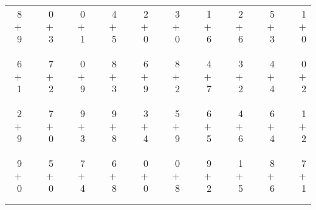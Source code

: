 \documentclass[12pt, letterpaper]{article}
\begin{document}
\begin{tabular}{rrrrrrrrrrrrrrrrrrr}
8 & & 0 & & 0 & & 4 & & 2 & & 3 & & 1 & & 2 & & 5 & & 1\\
$+$ 9 & & $+$ 3 & & $+$ 1 & & $+$ 5 & & $+$ 0 & & $+$ 0 & & $+$ 6 & & $+$ 6 & & $+$ 3 & & $+$ 0\\
\cline{1-1} \cline{3-3} \cline{5-5} \cline{7-7} \cline{9-9} \cline{11-11} \cline{13-13} \cline{15-15} \cline{17-17} \cline{19-19} \\ \\
6 & & 7 & & 0 & & 8 & & 6 & & 8 & & 4 & & 3 & & 4 & & 0\\
$+$ 1 & & $+$ 2 & & $+$ 9 & & $+$ 3 & & $+$ 9 & & $+$ 2 & & $+$ 7 & & $+$ 2 & & $+$ 4 & & $+$ 2\\
\cline{1-1} \cline{3-3} \cline{5-5} \cline{7-7} \cline{9-9} \cline{11-11} \cline{13-13} \cline{15-15} \cline{17-17} \cline{19-19} \\ \\
2 & & 7 & & 9 & & 9 & & 3 & & 5 & & 6 & & 4 & & 6 & & 1\\
$+$ 9 & & $+$ 0 & & $+$ 3 & & $+$ 8 & & $+$ 4 & & $+$ 9 & & $+$ 5 & & $+$ 6 & & $+$ 4 & & $+$ 2\\
\cline{1-1} \cline{3-3} \cline{5-5} \cline{7-7} \cline{9-9} \cline{11-11} \cline{13-13} \cline{15-15} \cline{17-17} \cline{19-19} \\ \\
9 & & 5 & & 7 & & 6 & & 0 & & 0 & & 9 & & 1 & & 8 & & 7\\
$+$ 0 & & $+$ 0 & & $+$ 4 & & $+$ 8 & & $+$ 0 & & $+$ 8 & & $+$ 2 & & $+$ 5 & & $+$ 6 & & $+$ 1\\
\cline{1-1} \cline{3-3} \cline{5-5} \cline{7-7} \cline{9-9} \cline{11-11} \cline{13-13} \cline{15-15} \cline{17-17} \cline{19-19} \\ \\
\end{tabular}
\newpage
\end{document}
